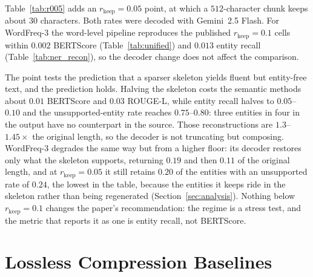 \documentclass[11pt]{article}
\newcommand{\rkeep}{r_{\mathrm{keep}}}
\begin{document}
Table~\ref{tab:r005} adds an $\rkeep = 0.05$ point, at which a $512$-character chunk keeps about
$30$ characters. Both rates were decoded with Gemini~2.5 Flash. For WordFreq-3 the word-level pipeline reproduces the published $\rkeep = 0.1$ cells within
$0.002$ BERTScore (Table~\ref{tab:unified}) and $0.013$ entity recall (Table~\ref{tab:ner_recon}), so the decoder change does not affect the comparison.

The point tests the prediction that a sparser skeleton yields fluent but entity-free text, and the
prediction holds. Halving the skeleton costs the semantic methods about $0.01$ BERTScore and $0.03$
ROUGE-L, while entity recall halves to $0.05$--$0.10$ and the unsupported-entity rate reaches
$0.75$--$0.80$: three entities in four in the output have no counterpart in the source. Those
reconstructions are $1.3$--$1.45\times$ the original length, so the decoder is not truncating but
composing. WordFreq-3 degrades the same way but from a higher floor: its decoder restores only
what the skeleton supports, returning $0.19$ and then $0.11$ of the original length, and at
$\rkeep = 0.05$ it still retains $0.20$ of the entities with an unsupported rate of $0.24$, the lowest in
the table, because the entities it keeps ride in the skeleton rather than being regenerated
(Section~\ref{sec:analysis}). Nothing below $\rkeep = 0.1$
changes the paper's recommendation: the regime is a stress test, and the metric that reports it as one is
entity recall, not BERTScore.

\section{Lossless Compression Baselines}
\label{app:lossless_baselines}
\end{document}
